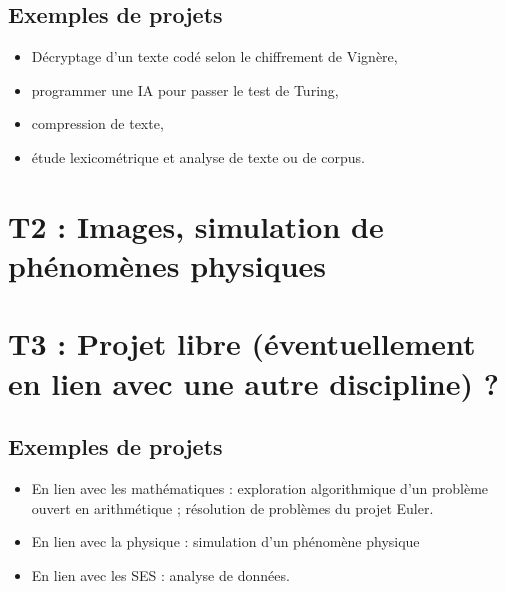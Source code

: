 \documentclass[a4paper,11pt,DIV11,BCOR0mm]{scrartcl}
\begin{document}
\subsection*{Exemples de projets}
\begin{itemize}
  \item Décryptage d'un texte codé selon le chiffrement de Vignère,
  \item programmer une IA pour passer le test de Turing,
  \item compression de texte,
  \item étude lexicométrique et analyse de texte ou de corpus.
\end{itemize}



\section*{T2 : Images, simulation de phénomènes physiques}

\section*{T3 : Projet libre (éventuellement en lien avec une autre discipline) ?}
\subsection*{Exemples de projets}
\begin{itemize}
  \item En lien avec les mathématiques : exploration
  algorithmique d'un problème ouvert en arithmétique ; résolution de problèmes
  du projet Euler.
  \item En lien avec la physique : simulation d'un phénomène physique
  \item En lien avec les SES : analyse de données.
\end{itemize}
\end{document}
